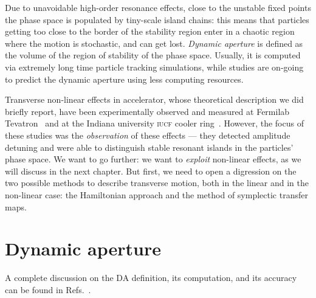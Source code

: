 Due to unavoidable high-order resonance effects, close to the unstable fixed points the phase space is populated by tiny-scale island chains: this means that particles getting too close to the border of the stability region enter in a chaotic region where the motion is stochastic, and can get lost. \textit{Dynamic aperture} is defined as the volume of the region of stability of the phase space. Usually, it is computed via extremely long time particle tracking simulations, while studies are on-going to predict the dynamic aperture using less computing resources.~\cite{PhysRevAccelBeams.22.104003}

\parseparator

Transverse non-linear effects in accelerator, whose theoretical description we did briefly report, have been experimentally observed and measured at Fermilab Tevatron~\cite{PhysRevLett.61.2752} and at the Indiana university \textsc{iucf} cooler ring~\cite{leeiucf}. However, the focus of these studies was the \textit{observation} of these effects --- they detected amplitude detuning and were able to distinguish stable resonant islands in the particles' phase space. We want to go further: we want to \textit{exploit} non-linear effects, as we will discuss in the next chapter. But first, we need to open a digression on the two possible methods to describe transverse motion, both in the linear and in the non-linear case: the Hamiltonian approach and the method of symplectic transfer maps.


\section{Dynamic aperture}

A complete discussion on the DA definition, its computation, and its accuracy can be found in Refs.~\cite{todesco1996dynamic, giovannozzi1998dynamic}.

